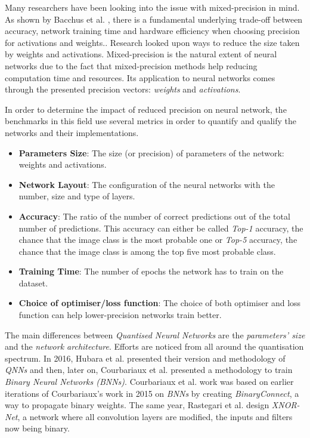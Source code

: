 Many researchers have been looking into the issue with mixed-precision in mind. As shown by Bacchus et al. \cite{Bacchus2020}, there is a fundamental underlying trade-off between accuracy, network training time and hardware efficiency when choosing precision for activations and weights.. Research looked upon ways to reduce the size taken by weights and activations. Mixed-precision is the natural extent of neural networks due to the fact that mixed-precision methods help reducing computation time and resources. Its application to neural networks comes through the presented precision vectors: \emph{weights} and \emph{activations}.

In order to determine the impact of reduced precision on neural network, the benchmarks in this field use several metrics in order to quantify and qualify the networks and their implementations.
\begin{itemize}
	\item \textbf{Parameters Size}: The size (or precision) of parameters of the network: weights and activations.
	\item \textbf{Network Layout}: The configuration of the neural networks with the number, size and type of layers.
	\item \textbf{Accuracy}: The ratio of the number of correct predictions out of the total number of predictions. This accuracy can either be called \emph{Top-1} accuracy, the chance that the image class is the most probable one or \emph{Top-5} accuracy, the chance that the image class is among the top five most probable class.
	\item \textbf{Training Time}: The number of epochs the network has to train on the dataset.
  \item \textbf{Choice of optimiser/loss function}: The choice of both optimiser and loss function can help lower-precision networks train better.
\end{itemize}

The main differences between \emph{Quantised Neural Networks} are the \emph{parameters' size} and the \emph{network architecture}. Efforts are noticed from all around the quantisation spectrum. In 2016, Hubara et al. \cite{Hubara2016} presented their version and methodology of \emph{QNNs} and then, later on, Courbariaux et al. \cite{Courbariaux2016} presented a methodology to train \emph{Binary Neural Networks (BNNs)}. Courbariaux et al. work was based on earlier iterations of Courbariaux's work in 2015 \cite{Courbariaux2015} on \emph{BNNs} by creating \emph{BinaryConnect}, a way to propagate binary weights. The same year, Rastegari et al. \cite{Rastegari2016} design \emph{XNOR-Net}, a network where all convolution layers are modified, the inputs and filters now being binary.

